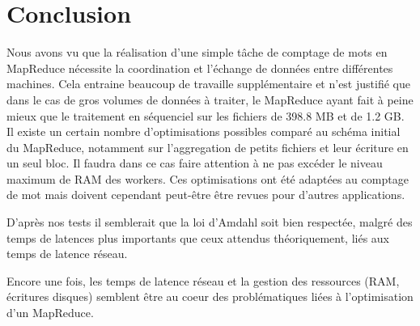\documentclass[11pt,a4paper]{article}
\begin{document}
\section*{Conclusion}

Nous avons vu que la réalisation d'une simple tâche de comptage de mots en MapReduce nécessite la coordination et l'échange de données entre différentes machines. Cela entraine beaucoup de travaille supplémentaire et n'est justifié que dans le cas de gros volumes de données à traiter, le MapReduce ayant fait à peine mieux que le traitement en séquenciel sur les fichiers de 398.8 MB et de 1.2 GB. Il existe un certain nombre d'optimisations possibles comparé au schéma initial du MapReduce, notamment sur l'aggregation de petits fichiers et leur écriture en un seul bloc. Il faudra dans ce cas faire attention à ne pas excéder le niveau maximum de RAM des workers. Ces optimisations ont été adaptées au comptage de mot mais doivent cependant peut-être être revues pour d'autres applications.

D'après nos tests il semblerait que la loi d'Amdahl soit bien respectée, malgré des temps de latences plus importants que ceux attendus théoriquement, liés aux temps de latence réseau.

Encore une fois, les temps de latence réseau et la gestion des ressources (RAM, écritures disques) semblent être au coeur des problématiques liées à l'optimisation d'un MapReduce.
\end{document}

